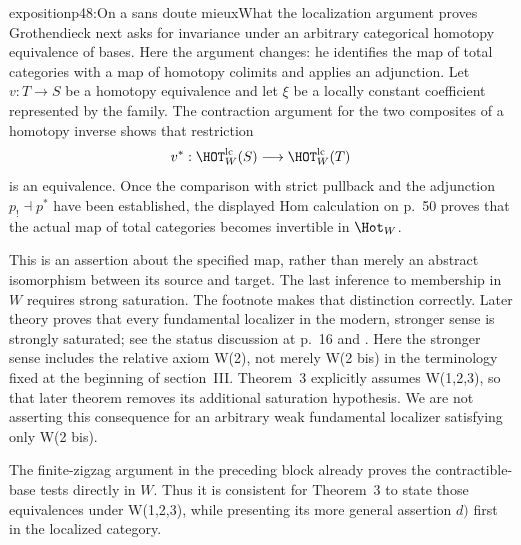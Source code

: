 \begin{dcomment}{exposition}{p48:On a sans doute mieux}{What the localization argument proves}
Grothendieck next asks for invariance under an arbitrary categorical homotopy equivalence of bases. Here the argument changes: he identifies the map of total categories with a map of homotopy colimits and applies an adjunction. Let $v:T\to S$ be a homotopy equivalence and let $\xi$ be a locally constant coefficient represented by the family. The contraction argument for the two composites of a homotopy inverse shows that restriction
\[
 v^*:\HOT_W^{\mathrm{lc}}(S)\longrightarrow\HOT_W^{\mathrm{lc}}(T)
\]
is an equivalence. Once the comparison with strict pullback and the adjunction $p_!\dashv p^*$ have been established, the displayed Hom calculation on p.~50 proves that the actual map of total categories becomes invertible in $\Hot_W$.

This is an assertion about the specified map, rather than merely an abstract isomorphism between its source and target. The last inference to membership in $W$ requires strong saturation. The footnote makes that distinction correctly. Later theory proves that every fundamental localizer in the modern, stronger sense is strongly saturated; see the status discussion at p.~16 and \citep[Proposition~4.2.4]{Cisinski2006}. Here the stronger sense includes the relative axiom W(2), not merely W(2 bis) in the terminology fixed at the beginning of section~III. Theorem~3 explicitly assumes W(1,2,3), so that later theorem removes its additional saturation hypothesis. We are not asserting this consequence for an arbitrary weak fundamental localizer satisfying only W(2 bis).

The finite-zigzag argument in the preceding block already proves the contractible-base tests directly in $W$. Thus it is consistent for Theorem~3 to state those equivalences under W(1,2,3), while presenting its more general assertion $d)$ first in the localized category.
\end{dcomment}

